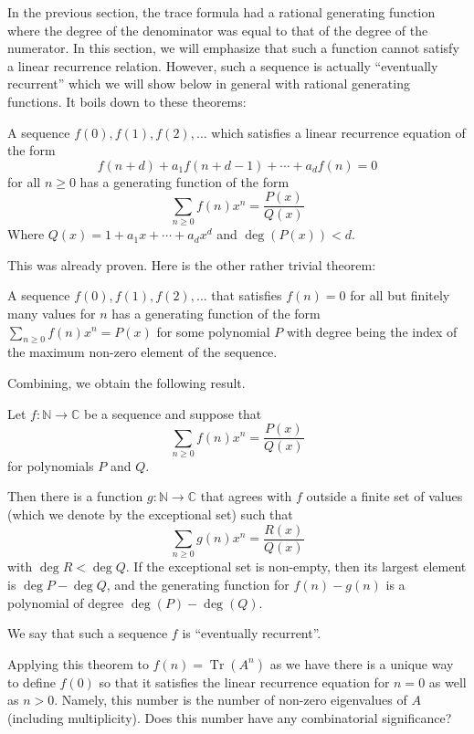 In the previous section, the trace formula had a rational generating function where the degree of the denominator was equal to that of the degree of the numerator. In this section, we will emphasize that such a function cannot satisfy a linear recurrence relation. However, such a sequence is actually ``eventually recurrent'' which we will show below in general with rational generating functions. It boils down to these theorems:

\begin{theorem}
A sequence $f(0), f(1), f(2), \dots$ which satisfies a linear recurrence equation of the form
\[f(n + d) + a_1f(n + d - 1) + \cdots + a_df(n) = 0\]
for all $n \geq 0$ has a generating function of the form 
\[\sum_{n \geq 0}f(n)x^n = \frac{P(x)}{Q(x)}\]
Where $Q(x) = 1 + a_1x + \cdots + a_dx^d$ and $\deg(P(x)) < d$.
\end{theorem}

This was already proven. Here is the other rather trivial theorem:

\begin{theorem}
A sequence $f(0), f(1), f(2), \dots$ that satisfies $f(n) = 0$ for all but finitely many values for $n$ has a generating function of the form $\sum_{n \geq 0} f(n)x^n = P(x)$ for some polynomial $P$ with degree being the index of the maximum non-zero element of the sequence.
\end{theorem}

Combining, we obtain the following result.

\begin{theorem}
Let $f:\mathbb{N} \to \mathbb{C}$ be a sequence and suppose that 
\[\sum_{n \geq 0}f(n)x^n = \frac{P(x)}{Q(x)}\] for polynomials $P$ and $Q$.

Then there is a function $g: \mathbb{N} \to \mathbb{C}$ that agrees with $f$ outside a finite set of values (which we denote by the exceptional set) such that
\[\sum_{n \geq 0}g(n)x^n = \frac{R(x)}{Q(x)}\] with $\deg{R} < \deg{Q}$. If the exceptional set is non-empty, then its largest element is $\deg{P} - \deg{Q}$, and the generating function for $f(n) - g(n)$ is a polynomial of degree $\deg(P) - \deg(Q)$.
\end{theorem}

We say that such a sequence $f$ is ``eventually recurrent''.

Applying this theorem to $f(n) = \operatorname{Tr}(A^n)$ as we have there is a unique way to define $f(0)$ so that it satisfies the linear recurrence equation for $n = 0$ as well as $n > 0$. Namely, this number is the number of non-zero eigenvalues of $A$ (including multiplicity). Does this number have any combinatorial significance?